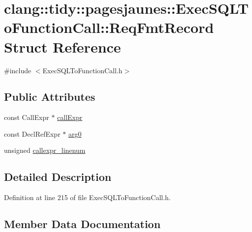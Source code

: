 \hypertarget{structclang_1_1tidy_1_1pagesjaunes_1_1_exec_s_q_l_to_function_call_1_1_req_fmt_record}{}\section{clang\+:\+:tidy\+:\+:pagesjaunes\+:\+:Exec\+S\+Q\+L\+To\+Function\+Call\+:\+:Req\+Fmt\+Record Struct Reference}
\label{structclang_1_1tidy_1_1pagesjaunes_1_1_exec_s_q_l_to_function_call_1_1_req_fmt_record}


{\ttfamily \#include $<$Exec\+S\+Q\+L\+To\+Function\+Call.\+h$>$}

\subsection*{Public Attributes}
\begin{DoxyCompactItemize}
\item 
const Call\+Expr $\ast$ \hyperlink{structclang_1_1tidy_1_1pagesjaunes_1_1_exec_s_q_l_to_function_call_1_1_req_fmt_record_a8679dc2712807eb08d4ba2d339ac7245}{call\+Expr}
\item 
const Decl\+Ref\+Expr $\ast$ \hyperlink{structclang_1_1tidy_1_1pagesjaunes_1_1_exec_s_q_l_to_function_call_1_1_req_fmt_record_ae28f58a76f0d75757a07149e38839ebc}{arg0}
\item 
unsigned \hyperlink{structclang_1_1tidy_1_1pagesjaunes_1_1_exec_s_q_l_to_function_call_1_1_req_fmt_record_ab74e569e14b4236c1c8d4d1a2e9e2187}{callexpr\+\_\+linenum}
\end{DoxyCompactItemize}


\subsection{Detailed Description}


Definition at line 215 of file Exec\+S\+Q\+L\+To\+Function\+Call.\+h.



\subsection{Member Data Documentation}
\mbox{\label{structclang_1_1tidy_1_1pagesjaunes_1_1_exec_s_q_l_to_function_call_1_1_req_fmt_record_ae28f58a76f0d75757a07149e38839ebc}} 
